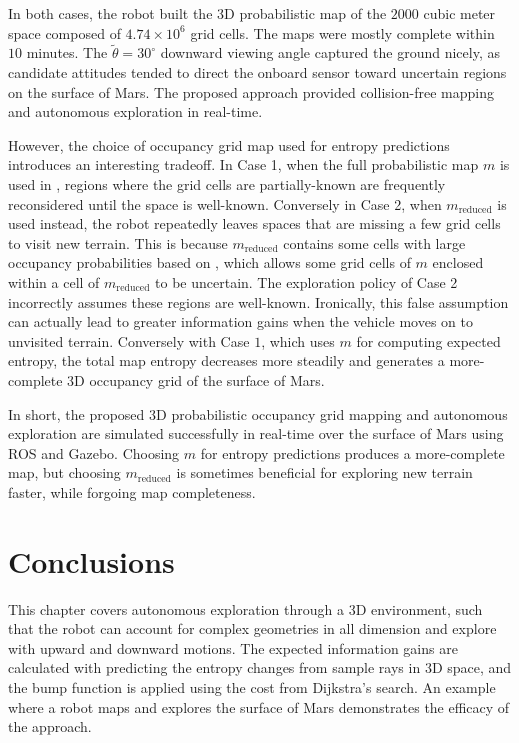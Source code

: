 In both cases, the robot built the 3D probabilistic map of the $2000$ cubic meter space composed of $4.74\times10^6$ grid cells. The maps were mostly complete within $10$ minutes. The $\tilde{\theta}=30^{\circ}$ downward viewing angle captured the ground nicely, as candidate attitudes tended to direct the onboard sensor toward uncertain regions on the surface of Mars. The proposed approach provided collision-free mapping and autonomous exploration in real-time.

However, the choice of occupancy grid map used for entropy predictions introduces an interesting tradeoff. In Case 1, when the full probabilistic map $m$ is used in , regions where the grid cells are partially-known are frequently reconsidered until the space is well-known. Conversely in Case 2, when $m_\text{reduced}$ is used instead, the robot repeatedly leaves spaces that are missing a few grid cells to visit new terrain. This is because $m_\text{reduced}$ contains some cells with large occupancy probabilities based on , which allows some grid cells of $m$ enclosed within a cell of $m_\text{reduced}$ to be uncertain. The exploration policy of Case 2 incorrectly assumes these regions are well-known. Ironically, this false assumption can actually lead to greater information gains when the vehicle moves on to unvisited terrain. Conversely with Case $1$, which uses $m$ for computing expected entropy, the total map entropy decreases more steadily and generates a more-complete 3D occupancy grid of the surface of Mars.

In short, the proposed 3D probabilistic occupancy grid mapping and autonomous exploration are simulated successfully in real-time over the surface of Mars using ROS and Gazebo. Choosing $m$ for entropy predictions produces a more-complete map, but choosing $m_\text{reduced}$ is sometimes beneficial for exploring new terrain faster, while forgoing map completeness.



\section{Conclusions}

This chapter covers autonomous exploration through a 3D environment, such that the robot can account for complex geometries in all dimension and explore with upward and downward motions. The expected information gains are calculated with predicting the entropy changes from sample rays in 3D space, and the bump function is applied using the cost from Dijkstra's search. An example where a robot maps and explores the surface of Mars demonstrates the efficacy of the approach.




